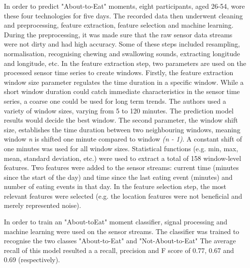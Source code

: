 
In order to predict "About-to-Eat" moments, eight participants, aged 26-54, wore these four technologies for five days. The recorded data then underwent cleaning and preprocessing, feature extraction, feature selection and machine learning. During the preprocessing, it was made sure that the raw sensor data streams were not dirty and had high accuracy. Some of these steps included resampling, normalisation, recognising chewing and swallowing sounds, extracting longitude and longitude, etc. 
In the feature extraction step, two parameters are used on the processed sensor time series to create windows. Firstly, the feature extraction window size parameter regulates the time duration in a specific window. While a short window duration could catch immediate characteristics in the sensor time series, a coarse one could be used for long term trends. The authors used a variety of window sizes, varying from 5 to 120 minutes. The prediction model results would decide the best window. The second parameter, the window shift size, establishes the time duration between two neighbouring windows, meaning window \textit{n} is shifted one minute compared to window \textit{(n - 1)}. A constant shift of one minutes was used for all window sizes. Statistical functions (e.g. min, max, mean, standard deviation, etc.) were used to extract a total of 158 window-level features. Two features were added to the sensor streams: current time (minutes since the start of the day) and time since the last eating event (minutes) and number of eating events in that day.
In the feature selection step, the most relevant features were selected (e.g. the location features were not beneficial and merely represented noise).

In order to train an "About-toEat" moment classifier, signal processing and machine learning were used on the sensor streams. The classifier was trained to recognise the two classes "About-to-Eat" and "Not-About-to-Eat"  The average recall of this model resulted a a recall, precision and F score of 0.77, 0.67 and 0.69 (respectively).

